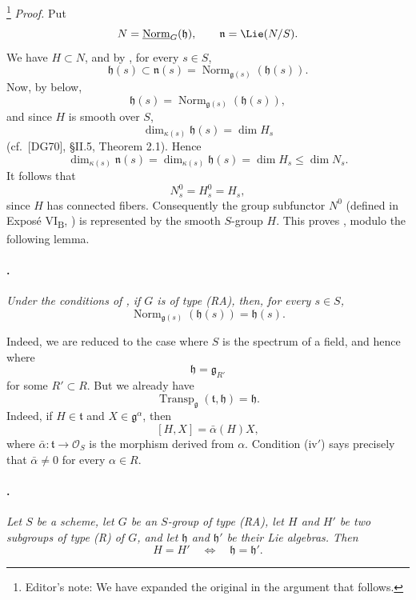 \footnote{Editor's note: We have expanded the original in the
argument that follows.} \emph{Proof.} Put
\[
  N=\underline{\operatorname{Norm}}_G(\mathfrak h),
  \qquad
  \mathfrak n=\Lie(N/S).
\]
We have \(H\subset N\), and by , for every
\(s\in S\),
\[
  \mathfrak h(s)
  \subset
  \mathfrak n(s)
  =
  \operatorname{Norm}_{\mathfrak g(s)}(\mathfrak h(s)).
\]
Now, by  below,
\[
  \mathfrak h(s)
  =
  \operatorname{Norm}_{\mathfrak g(s)}(\mathfrak h(s)),
\]
and since \(H\) is smooth over \(S\),
\[
  \dim_{\kappa(s)}\mathfrak h(s)=\dim H_s
\]
\textup{(cf.\ \textup{[DG70]}, \S II.5, Theorem 2.1)}. Hence
\[
  \dim_{\kappa(s)}\mathfrak n(s)
  =
  \dim_{\kappa(s)}\mathfrak h(s)
  =
  \dim H_s
  \leq
  \dim N_s.
\]
It follows that
\[
  N_s^0=H_s^0=H_s,
\]
since \(H\) has connected fibers. Consequently the group subfunctor
\(N^0\) \textup{(defined in Exposé VI\textsubscript{B}, )} is
represented by the smooth \(S\)-group \(H\). This proves ,
modulo the following lemma.

\paragraph{.}
\textit{Under the conditions of , if \(G\) is of type
\textup{(RA)}, then, for every \(s\in S\),}
\[
  \operatorname{Norm}_{\mathfrak g(s)}(\mathfrak h(s))
  =
  \mathfrak h(s).
\]

Indeed, we are reduced to the case where \(S\) is the spectrum of a
field, and hence where
\[
  \mathfrak h=\mathfrak g_{R'}
\]
for some \(R'\subset R\). But we already have
\[
  \operatorname{Transp}_{\mathfrak g}
    (\mathfrak t,\mathfrak h)
  =
  \mathfrak h.
\]
Indeed, if \(H\in\mathfrak t\) and
\(X\in\mathfrak g^\alpha\), then
\[
  [H,X]=\bar\alpha(H)X,
\]
where \(\bar\alpha:\mathfrak t\to\mathcal O_S\) is the morphism
derived from \(\alpha\). Condition \textup{(iv$'$)} says precisely
that \(\bar\alpha\ne0\) for every \(\alpha\in R\).

\paragraph{.}
\textit{Let \(S\) be a scheme, let \(G\) be an \(S\)-group of type
\textup{(RA)}, let \(H\) and \(H'\) be two subgroups of type
\textup{(R)} of \(G\), and let \(\mathfrak h\) and
\(\mathfrak h'\) be their Lie algebras. Then}
\[
  H=H'
  \quad\Longleftrightarrow\quad
  \mathfrak h=\mathfrak h'.
\]


